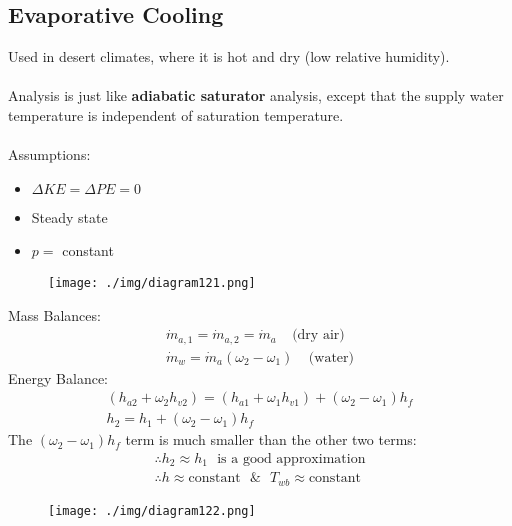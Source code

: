 \subsection{Evaporative Cooling}
Used in desert climates, where it is hot and dry (low relative humidity). \\\\
Analysis is just like \textbf{adiabatic saturator} analysis, except that the supply water temperature is independent of saturation temperature. \\\\
Assumptions:
\begin{itemize}[noitemsep]
  \item $\Delta KE = \Delta PE = 0$
  \item Steady state
  \item $p =$ constant
\end{itemize}
\begin{figure}[H]
  \centering
  \texttt{[image: ./img/diagram121.png]}
  \caption{}
\end{figure}
Mass Balances:
\begin{gather}
  \dot{m}_{a,1} = \dot{m}_{a,2} = \dot{m}_{a} \ \ \ \ \ \text{(dry air)} \\[5pt]
  \dot{m}_{w} = \dot{m}_{a}(\omega_2-\omega_1) \ \ \ \ \ \text{(water)}
\end{gather}
Energy Balance:
\begin{gather}
  (h_{a2} + \omega_2h_{v2}) = (h_{a1} + \omega_1h_{v1}) + (\omega_2-\omega_1)h_{f} \\[5pt]
  h_2 = h_1 + (\omega_2-\omega_1)h_f
\end{gather}
The $(\omega_2-\omega_1)h_f$ term is much smaller than the other two terms:
\begin{gather}
  \therefore h_2 \approx h_1 \ \ \ \text{is a good approximation} \\[5pt]
  \therefore h \approx \text{constant} \ \ \ \& \ \ \ T_{wb} \approx \text{constant}
\end{gather}
\begin{figure}[H]
  \centering
  \texttt{[image: ./img/diagram122.png]}
  \caption{}
\end{figure}
